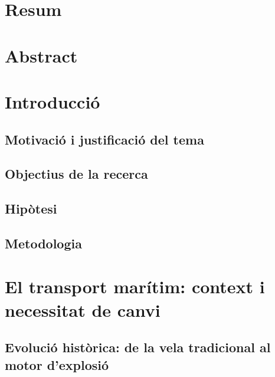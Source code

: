 \documentclass[12pt, a4paper]{report}
\begin{document}
\chapter*{Resum}

\clearpage

\chapter*{Abstract}

\clearpage

\chapter*{Introducció}

\section*{Motivació i justificació del tema}

\section*{Objectius de la recerca}

\section*{Hipòtesi}

\section*{Metodologia}

\clearpage

\chapter{El transport marítim: context i necessitat de canvi}
\section{Evolució històrica: de la vela tradicional al motor d'explosió}
\end{document}
